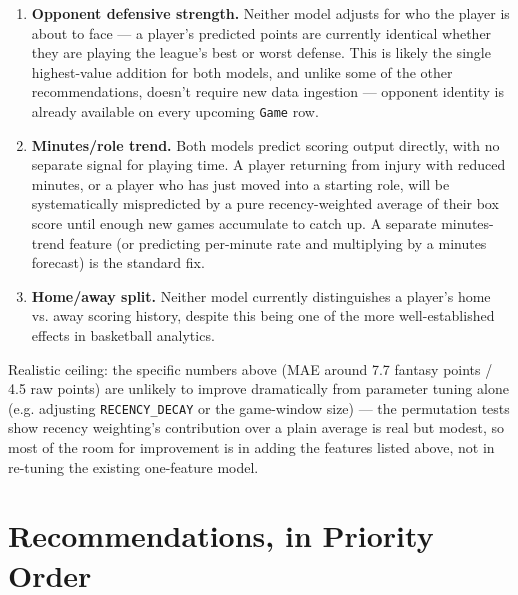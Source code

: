 \documentclass[11pt]{article}
\newcommand{\code}[1]{\allowbreak\texttt{\small #1}\allowbreak}
\begin{document}
\begin{enumerate}
    \item \textbf{Opponent defensive strength.} Neither model adjusts for who the player is about to face —
    a player's predicted points are currently identical whether they are playing the league's best or worst
    defense. This is likely the single highest-value addition for both models, and unlike some of the other
    recommendations, doesn't require new data ingestion — opponent identity is already available on every
    upcoming \code{Game} row.
    \item \textbf{Minutes/role trend.} Both models predict scoring output directly, with no separate signal
    for playing time. A player returning from injury with reduced minutes, or a player who has just moved
    into a starting role, will be systematically mispredicted by a pure recency-weighted average of their
    box score until enough new games accumulate to catch up. A separate minutes-trend feature (or predicting
    per-minute rate and multiplying by a minutes forecast) is the standard fix.
    \item \textbf{Home/away split.} Neither model currently distinguishes a player's home vs. away scoring
    history, despite this being one of the more well-established effects in basketball analytics.
\end{enumerate}

Realistic ceiling: the specific numbers above (MAE around 7.7 fantasy points / 4.5 raw points) are unlikely
to improve dramatically from parameter tuning alone (e.g. adjusting \code{RECENCY\_DECAY} or the game-window
size) — the permutation tests show recency weighting's contribution over a plain average is real but modest,
so most of the room for improvement is in adding the features listed above, not in re-tuning the existing
one-feature model.

\section{Recommendations, in Priority Order}
\end{document}
